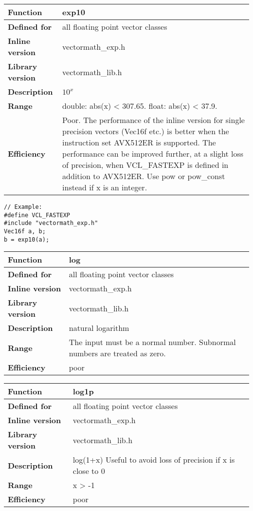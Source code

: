 \documentclass[vcl_manual.tex]{subfiles}
\begin{document}
\begin{tabular}{|p{30mm}|p{120mm}|}
\hline
\bfseries Function & exp10 \\ \hline
\bfseries Defined for & all floating point vector classes \\ \hline
\bfseries Inline version & vectormath\_exp.h \\ \hline
\bfseries Library version & vectormath\_lib.h \\ \hline
\bfseries Description & $10^x$ \\ \hline
\bfseries Range & double: abs(x) \textless{} 307.65. float: abs(x) \textless{} 37.9. \\ \hline
\bfseries Efficiency & Poor. The performance of the inline version for single precision vectors (Vec16f etc.) is better when the instruction set AVX512ER is supported. The performance can be improved further, at a slight loss of precision, when VCL\_FASTEXP is defined in addition to AVX512ER. \newline
Use pow or pow\_const instead if x is an integer. \\ \hline
\end{tabular}
\begin{lstlisting}[frame=none]
// Example:
#define VCL_FASTEXP
#include "vectormath_exp.h"
Vec16f a, b;
b = exp10(a); 
\end{lstlisting}


\begin{tabular}{|p{30mm}|p{120mm}|}
\hline
\bfseries Function & log \\ \hline
\bfseries Defined for & all floating point vector classes \\ \hline
\bfseries Inline version & vectormath\_exp.h \\ \hline
\bfseries Library version & vectormath\_lib.h \\ \hline
\bfseries Description & natural logarithm \\ \hline
\bfseries Range & The input must be a normal number. Subnormal numbers are treated as zero. \\ \hline
\bfseries Efficiency & poor \\ \hline
\end{tabular}


\begin{tabular}{|p{30mm}|p{120mm}|}
\hline
\bfseries Function & log1p \\ \hline
\bfseries Defined for & all floating point vector classes \\ \hline
\bfseries Inline version & vectormath\_exp.h \\ \hline
\bfseries Library version & vectormath\_lib.h \\ \hline
\bfseries Description & log(1+x) \newline
Useful to avoid loss of precision if x is close to 0 \\ \hline
\bfseries Range & x \textgreater{} -1 \\ \hline
\bfseries Efficiency & poor \\ \hline
\end{tabular}
\end{document}
